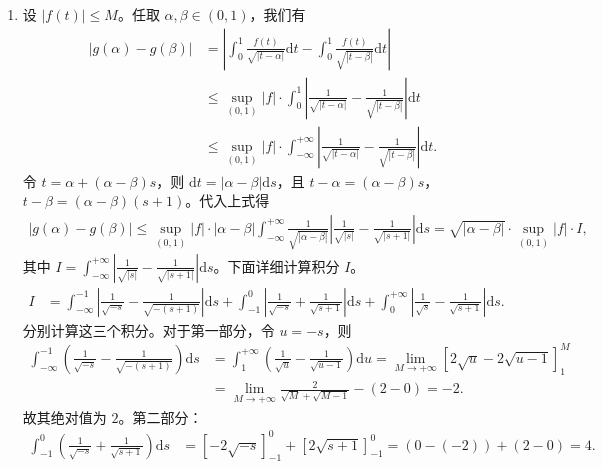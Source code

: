 \documentclass[../../main.tex]{subfiles}%
\begin{document}
\begin{solution}
\begin{enumerate}[(1)]
\item 设 \(|f(t)| \leqslant M\)。任取 \(\alpha, \beta \in (0,1)\)，我们有
\begin{align*}
|g(\alpha) - g(\beta)| &= \left| \int_{0}^{1} \frac{f(t)}{\sqrt{|t-\alpha|}} \mathrm{d}t - \int_{0}^{1} \frac{f(t)}{\sqrt{|t-\beta|}} \mathrm{d}t \right| \\
&\leqslant \sup_{(0,1)} |f| \cdot \int_{0}^{1} \left| \frac{1}{\sqrt{|t-\alpha|}} - \frac{1}{\sqrt{|t-\beta|}} \right| \mathrm{d}t \\
&\leqslant \sup_{(0,1)} |f| \cdot \int_{-\infty}^{+\infty} \left| \frac{1}{\sqrt{|t-\alpha|}} - \frac{1}{\sqrt{|t-\beta|}} \right| \mathrm{d}t.
\end{align*}
令 \(t = \alpha + (\alpha - \beta)s\)，则 \(\mathrm{d}t = |\alpha - \beta| \mathrm{d}s\)，且 \(t-\alpha = (\alpha - \beta)s\)，\(t-\beta = (\alpha - \beta)(s+1)\)。代入上式得
\begin{align*}
|g(\alpha) - g(\beta)| \leqslant \sup_{(0,1)} |f| \cdot |\alpha-\beta| \int_{-\infty}^{+\infty} \frac{1}{\sqrt{|\alpha-\beta|}} \left| \frac{1}{\sqrt{|s|}} - \frac{1}{\sqrt{|s+1|}} \right| \mathrm{d}s = \sqrt{|\alpha-\beta|} \cdot \sup_{(0,1)} |f| \cdot I,
\end{align*}
其中 \(I = \int_{-\infty}^{+\infty} \left| \frac{1}{\sqrt{|s|}} - \frac{1}{\sqrt{|s+1|}} \right| \mathrm{d}s\)。下面详细计算积分 \(I\)。
\begin{align*}
I &= \int_{-\infty}^{-1} \left| \frac{1}{\sqrt{-s}} - \frac{1}{\sqrt{-(s+1)}} \right| \mathrm{d}s + \int_{-1}^{0} \left| \frac{1}{\sqrt{-s}} + \frac{1}{\sqrt{s+1}} \right| \mathrm{d}s + \int_{0}^{+\infty} \left| \frac{1}{\sqrt{s}} - \frac{1}{\sqrt{s+1}} \right| \mathrm{d}s.
\end{align*}
分别计算这三个积分。对于第一部分，令 \(u = -s\)，则
\begin{align*}
\int_{-\infty}^{-1} \left( \frac{1}{\sqrt{-s}} - \frac{1}{\sqrt{-(s+1)}} \right) \mathrm{d}s &= \int_{1}^{+\infty} \left( \frac{1}{\sqrt{u}} - \frac{1}{\sqrt{u-1}} \right) \mathrm{d}u = \lim_{M \to +\infty} \left[ 2\sqrt{u} - 2\sqrt{u-1} \right]_{1}^{M} \\
&= \lim_{M \to +\infty} \frac{2}{\sqrt{M} + \sqrt{M-1}} - (2 - 0) = -2.
\end{align*}
故其绝对值为 \(2\)。第二部分：
\begin{align*}
\int_{-1}^{0} \left( \frac{1}{\sqrt{-s}} + \frac{1}{\sqrt{s+1}} \right) \mathrm{d}s &= \left[ -2\sqrt{-s} \right]_{-1}^{0} + \left[ 2\sqrt{s+1} \right]_{-1}^{0} = (0 - (-2)) + (2 - 0) = 4.

\end{align*}
\end{enumerate}
\end{solution}
\end{document}

